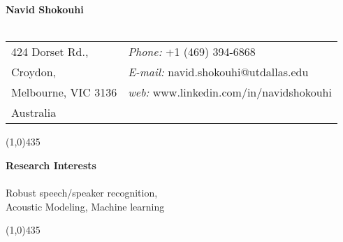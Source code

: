 \newenvironment{list1}{
	\begin{list}{\ding{113}}{%
			\setlength{\itemsep}{0in}
			\setlength{\parsep}{0in} \setlength{\parskip}{0in}
			\setlength{\topsep}{0in} \setlength{\partopsep}{0in} 
			\setlength{\leftmargin}{0.17in}}}{\end{list}}
\newenvironment{list2}{
	\begin{list}{$\bullet$}{%
			\setlength{\itemsep}{0in}
			\setlength{\parsep}{0in} \setlength{\parskip}{0in}
			\setlength{\topsep}{0in} \setlength{\partopsep}{0in} 
			\setlength{\leftmargin}{0.2in}}}{\end{list}}


	\textbf{\sc \bf Navid Shokouhi\\\\}
	\begin{tabular}{@{}p{2.25in}p{4in}}
		424 Dorset Rd., &    {\it Phone:} +1 (469) 394-6868\\        
		Croydon, &  {\it E-mail:}  navid.shokouhi@utdallas.edu\\     
		Melbourne, VIC 3136  &  {\it web:} www.linkedin.com/in/navidshokouhi\\         
		Australia &  
		
	\end{tabular}
	
	\line(1,0){435}
	
	
	\vspace{0mm}
	\textbf{\sc Research Interests\\\\}
	Robust speech/speaker recognition, \\
	Acoustic Modeling, Machine learning
	
	\line(1,0){435}
	
